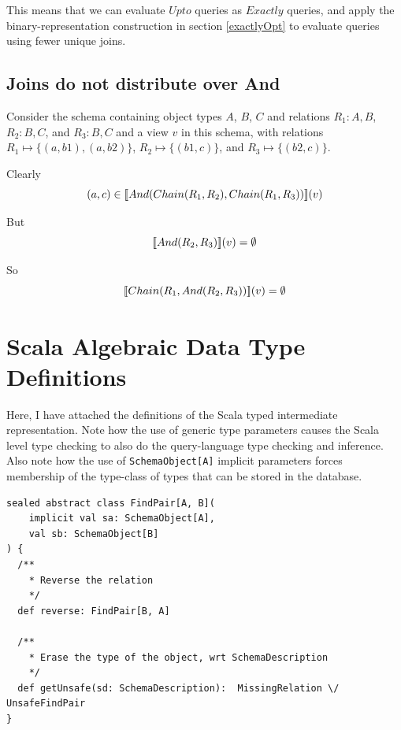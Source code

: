\documentclass[12pt,a4paper,twoside,openright]{report}
\newcommand\codeName[1]{\texttt{#1}}
\newcommand{\db}[1]{{\bf [\![}#1{\bf ]\!]}}
\newcommand{\deno}[1]{\db{#1}(v)}
\newcommand{\denoRule}[2]{#1 \in \deno{#2}}
\renewcommand{\baselinestretch}{1.1}    %
\begin{document}
This means that we can evaluate $Upto$ queries as $Exactly$ queries, and apply the binary-representation construction in section \ref{exactlyOpt} to evaluate queries using fewer unique joins.


\section{Joins do not distribute over And}

Consider the schema containing object types $A$, $B$, $C$ and relations $R_1 \colon A,B$, $R_2 \colon B,C$,  and $R_3 \colon B,C$ and a view $v$ in this schema, with relations $R_1 \mapsto \lbrace(a, b1), (a, b2)\rbrace$, $R_2 \mapsto \lbrace(b1, c)\rbrace$, and $R_3 \mapsto \lbrace(b2, c)\rbrace$.

Clearly 
\begin{equation}
\denoRule{(a,c)}{And(Chain(R_1, R_2), Chain(R_1, R_3))}
\end{equation}

But 
\begin{equation}
 \deno{And(R_2, R_3)} = \emptyset
\end{equation}

So
\begin{equation}
 \deno{Chain(R_1, And(R_2, R_3))} = \emptyset
\end{equation}
 
\chapter{Scala Algebraic Data Type Definitions}\label{ScalaADT}
Here, I have attached the definitions of the Scala typed intermediate representation. Note how the use of generic type parameters causes the Scala level type checking to also do the query-language type checking and inference. Also note how the use of \codeName{SchemaObject[A]} implicit parameters forces membership of the type-class of types that can be stored in the database.

\renewcommand{\baselinestretch}{0.8}
\begin{framed}
\begin{verbatim}
sealed abstract class FindPair[A, B](
    implicit val sa: SchemaObject[A],
    val sb: SchemaObject[B]
) {
  /**
    * Reverse the relation
    */
  def reverse: FindPair[B, A]

  /**
    * Erase the type of the object, wrt SchemaDescription
    */
  def getUnsafe(sd: SchemaDescription):  MissingRelation \/ UnsafeFindPair
}
\end{verbatim}
\end{framed}
\end{document}
